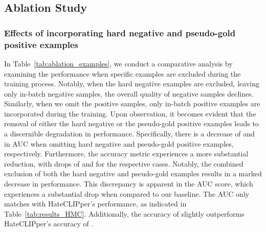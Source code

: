 \documentclass[11pt]{article}
\begin{document}
\subsection{Ablation Study}
\subsubsection{Effects of incorporating hard negative and pseudo-gold positive examples}
\label{sec:abl_exp}
In Table~\ref{tab:ablation_examples}, we conduct a comparative analysis by examining the performance when specific examples are excluded during the training process. Notably, when the hard negative examples are excluded, leaving only in-batch negative samples, the overall quality of negative samples declines. Similarly, when we omit the positive samples, only in-batch positive examples are incorporated during the training. Upon observation, it becomes evident that the removal of either the hard negative or the pseudo-gold positive examples leads to a discernible degradation in performance. Specifically, there is a decrease of  and  in AUC when omitting hard negative and pseudo-gold positive examples, respectively.  Furthermore, the accuracy metric experiences a more substantial reduction, with drops of  and  for the respective cases. Notably, the combined exclusion of both the hard negative and pseudo-gold examples results in a marked decrease in performance. This discrepancy is apparent in the AUC score, which experiences a substantial drop when compared to our baseline. The AUC only matches with HateCLIPper's performance, as indicated in Table~\ref{tab:results_HMC}. Additionally, the accuracy of  slightly outperforms HateCLIPper's accuracy of .
\end{document}
